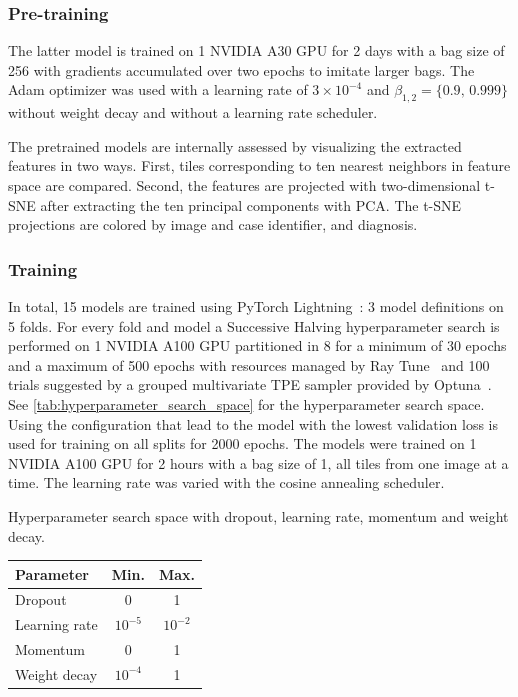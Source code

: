 \subsubsection{Pre-training}
The latter model is trained on 1 NVIDIA A30 GPU for 2 days with a bag size of 256 with gradients accumulated over two epochs to imitate larger bags.
The Adam optimizer was used with a learning rate of $3\times 10^{-4}$ and $\beta_{1,2} = \{0.9,\, 0.999\}$ without weight decay and without a learning rate scheduler.

The pretrained models are internally assessed by visualizing the extracted features in two ways.
First, tiles corresponding to ten nearest neighbors in feature space are compared.
Second, the features are projected with two-dimensional t-SNE after extracting the ten principal components with PCA.
The t-SNE projections are colored by image and case identifier, and diagnosis.

\subsubsection{Training}
In total, 15 models are trained using PyTorch Lightning~: 3 model definitions on 5 folds.
For every fold and model a Successive Halving hyperparameter search is performed on 1 NVIDIA A100 GPU partitioned in 8 for a minimum of 30 epochs and a maximum of 500 epochs with resources managed by Ray Tune~ and 100 trials suggested by a grouped multivariate TPE sampler provided by Optuna~.
See \cref{tab:hyperparameter_search_space} for the hyperparameter search space.
Using the configuration that lead to the model with the lowest validation loss is used for training on all splits for 2000 epochs.
The models were trained on 1 NVIDIA A100 GPU for 2 hours with a bag size of 1, \ie all tiles from one image at a time.
The learning rate was varied with the cosine annealing scheduler.

\begin{margintable}
    \caption[Hyperparameter search space]{
        Hyperparameter search space with dropout, learning rate, momentum and weight decay.
    }
    \label{tab:hyperparameter_search_space}
    \begin{tabular}{lcc}
        \toprule
        Parameter &  Min. & Max. \\
        \midrule
        Dropout & 0 & 1 \\
        Learning rate & $10^{-5}$ & $10^{-2}$ \\
        Momentum & 0 & 1 \\
        Weight decay & $10^{-4}$ & 1 \\
        \bottomrule
    \end{tabular}
\end{margintable}


